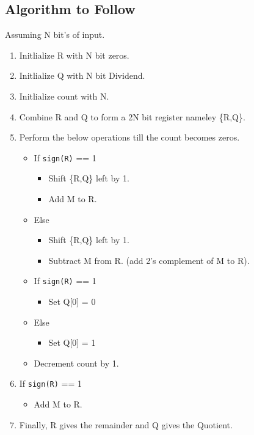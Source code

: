 \documentclass{article}
\begin{document}
\subsection{Algorithm to Follow}
Assuming N bit's of input.

\begin{enumerate}
    \item Initlialize R with N bit zeros.
    \item Initlialize Q with N bit Dividend.
    \item Initlialize count with N.
    \item Combine R and Q to form a 2N bit register nameley \{R,Q\}.
    \item Perform the below operations till the count becomes zeros.
          \begin{itemize}
              \item If \verb|sign(R)| == 1
                    \begin{itemize}
                        \item Shift \{R,Q\} left by 1.
                        \item Add M to R.
                    \end{itemize}
              \item Else
                    \begin{itemize}
                        \item Shift \{R,Q\} left by 1.
                        \item Subtract M from R. (add 2's complement of M to R).
                    \end{itemize}
              \item If \verb|sign(R)| == 1
                    \begin{itemize}
                        \item Set Q[0] = 0
                    \end{itemize}
              \item Else
                    \begin{itemize}
                        \item Set Q[0] = 1
                    \end{itemize}
              \item Decrement count by 1.
          \end{itemize}
    \item If \verb|sign(R)| == 1
          \begin{itemize}
              \item Add M to R.
          \end{itemize}
    \item Finally, R gives the remainder and Q gives the Quotient.
\end{enumerate}
\end{document}

